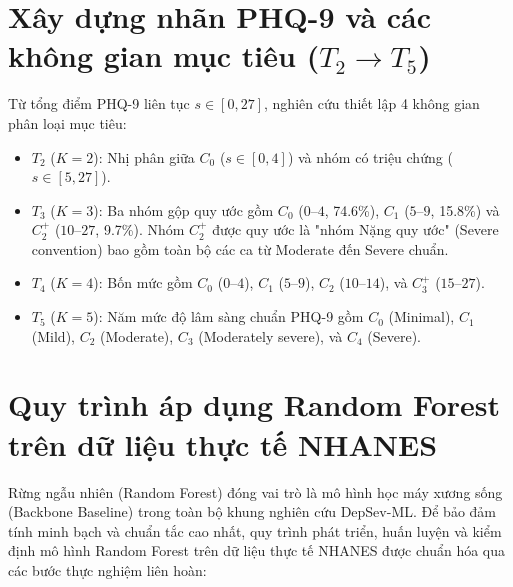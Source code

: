 \section{Xây dựng nhãn PHQ-9 và các không gian mục tiêu ($T_2 \to T_5$)}
\label{sec:nhan-muc-tieu}

Từ tổng điểm PHQ-9 liên tục $s \in [0, 27]$, nghiên cứu thiết lập 4 không gian phân loại mục tiêu:
\begin{itemize}
    \item $T_2$ ($K=2$): Nhị phân giữa $C_0$ ($s \in [0, 4]$) và nhóm có triệu chứng ($s \in [5, 27]$).
    \item $T_3$ ($K=3$): Ba nhóm gộp quy ước gồm $C_0$ ($0$--$4$, 74.6\%), $C_1$ ($5$--$9$, 15.8\%) và $C_2^+$ ($10$--$27$, 9.7\%). Nhóm $C_2^+$ được quy ước là "nhóm Nặng quy ước" (Severe convention) bao gồm toàn bộ các ca từ Moderate đến Severe chuẩn.
    \item $T_4$ ($K=4$): Bốn mức gồm $C_0$ ($0$--$4$), $C_1$ ($5$--$9$), $C_2$ ($10$--$14$), và $C_3^+$ ($15$--$27$).
    \item $T_5$ ($K=5$): Năm mức độ lâm sàng chuẩn PHQ-9 gồm $C_0$ (Minimal), $C_1$ (Mild), $C_2$ (Moderate), $C_3$ (Moderately severe), và $C_4$ (Severe).
\end{itemize}

\section{Quy trình áp dụng Random Forest trên dữ liệu thực tế NHANES}
\label{sec:xay-dung-random-forest}

Rừng ngẫu nhiên (Random Forest) đóng vai trò là mô hình học máy xương sống (Backbone Baseline) trong toàn bộ khung nghiên cứu DepSev-ML. Để bảo đảm tính minh bạch và chuẩn tắc cao nhất, quy trình phát triển, huấn luyện và kiểm định mô hình Random Forest trên dữ liệu thực tế NHANES được chuẩn hóa qua các bước thực nghiệm liên hoàn:

